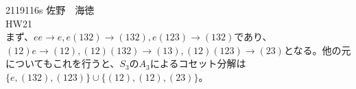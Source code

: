 \documentclass[11pt]{jsarticle}
\begin{document}
2119116s 佐野　海徳\\
HW21\\
まず、$ee\to e, e(132)\to(132),e(123)\to(132)$であり、$(12)e\to(12),(12)(132)\to(13),(12)(123)\to(23)$となる。他の元についてもこれを行うと、$S_3$の$A_3$によるコセット分解は$\{e,(132),(123)\}\cup\{(12),(12),(23)\}$。
\end{document}
